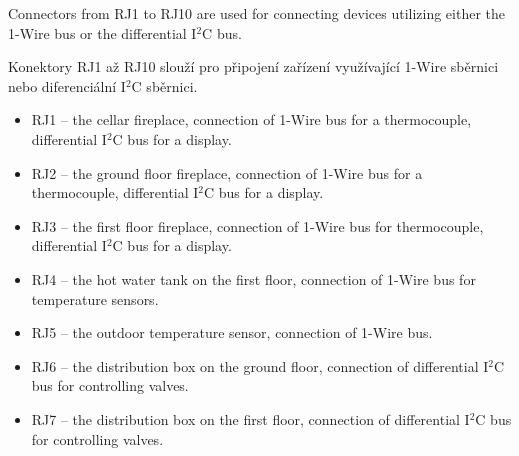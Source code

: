 \begin{English}
\end{English}

\begin{Czech}
\end{Czech}


\begin{English}
Connectors from RJ1 to RJ10 are used for connecting devices utilizing either the 1-Wire bus or the differential I$^2$C bus.
\end{English}

\begin{Czech}
Konektory RJ1 až RJ10 slouží pro připojení zařízení využívající 1-Wire sběrnici nebo diferenciální I$^2$C sběrnici.
\end{Czech}


\begin{English}
\begin{itemize}
  \item RJ1 – the cellar fireplace, connection of 1-Wire bus for a thermocouple, differential I$^2$C bus for a display.
  \item RJ2 – the ground floor fireplace, connection of 1-Wire bus for a thermocouple, differential I$^2$C bus for a display.
  \item RJ3 – the first floor fireplace, connection of 1-Wire bus for thermocouple, differential I$^2$C bus for a display.
  \item RJ4 – the hot water tank on the first floor, connection of 1-Wire bus for temperature sensors.
  \item RJ5 – the outdoor temperature sensor, connection of 1-Wire bus.
  \item RJ6 – the distribution box on the ground floor, connection of differential I$^2$C bus for controlling valves.
  \item RJ7 – the distribution box on the first floor, connection of differential I$^2$C bus for controlling valves.
\end{itemize}
\end{English}

